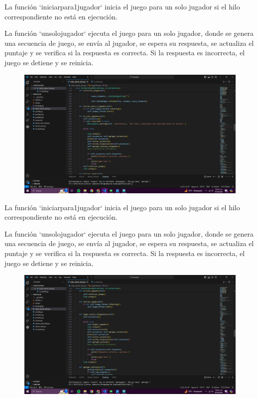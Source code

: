 \documentclass{article}
\begin{document}
{{\begin{figure}[h]
\end{figure}

{\Large La función `iniciarpara1jugador` inicia el juego para un solo jugador si el hilo correspondiente no está en ejecución.

La función `unsolojugador` ejecuta el juego para un solo jugador, donde se genera una secuencia de juego, se envía al jugador, se espera su respuesta, se actualiza el puntaje y se verifica si la respuesta es correcta. Si la respuesta es incorrecta, el juego se detiene y se reinicia.

}



\newpage
\begin{figure}[h]
    \centering
    \includegraphics[width=1\textwidth]{Captura de pantalla (770).png}
    
\end{figure}

{\Large La función `iniciarpara1jugador` inicia el juego para un solo jugador si el hilo correspondiente no está en ejecución.

La función `unsolojugador` ejecuta el juego para un solo jugador, donde se genera una secuencia de juego, se envía al jugador, se espera su respuesta, se actualiza el puntaje y se verifica si la respuesta es correcta. Si la respuesta es incorrecta, el juego se detiene y se reinicia.

}




\newpage
\begin{figure}[h]
    \centering
    \includegraphics[width=1\textwidth]{Captura de pantalla (771).png}
    

\end{figure}}}
\end{document}
